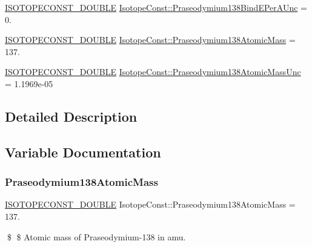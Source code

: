 \begin{DoxyCompactItemize}
\item 
\mbox{\hyperlink{group___isotope_const-_macros_ga8f45a7272ce02c0b4c65c44636ed719a}{I\+S\+O\+T\+O\+P\+E\+C\+O\+N\+S\+T\+\_\+\+D\+O\+U\+B\+LE}} \mbox{\hyperlink{group___isotope_const-_praseodymium-_pr138_gaea243280a0e30badcb25a6fd603f9291}{Isotope\+Const\+::\+Praseodymium138\+Bind\+E\+Per\+A\+Unc}} = 0.
\item 
\mbox{\hyperlink{group___isotope_const-_macros_ga8f45a7272ce02c0b4c65c44636ed719a}{I\+S\+O\+T\+O\+P\+E\+C\+O\+N\+S\+T\+\_\+\+D\+O\+U\+B\+LE}} \mbox{\hyperlink{group___isotope_const-_praseodymium-_pr138_gac33d5ded9b2d19757d1bdcb164920467}{Isotope\+Const\+::\+Praseodymium138\+Atomic\+Mass}} = 137.
\item 
\mbox{\hyperlink{group___isotope_const-_macros_ga8f45a7272ce02c0b4c65c44636ed719a}{I\+S\+O\+T\+O\+P\+E\+C\+O\+N\+S\+T\+\_\+\+D\+O\+U\+B\+LE}} \mbox{\hyperlink{group___isotope_const-_praseodymium-_pr138_ga272861c7648e2ab0210a8c75df8c022f}{Isotope\+Const\+::\+Praseodymium138\+Atomic\+Mass\+Unc}} = 1.\+1969e-\/05
\end{DoxyCompactItemize}


\subsection{Detailed Description}


\subsection{Variable Documentation}
\mbox{\label{group___isotope_const-_praseodymium-_pr138_gac33d5ded9b2d19757d1bdcb164920467}} 
\subsubsection{\texorpdfstring{Praseodymium138\+Atomic\+Mass}{Praseodymium138AtomicMass}}
{\footnotesize\ttfamily \mbox{\hyperlink{group___isotope_const-_macros_ga8f45a7272ce02c0b4c65c44636ed719a}{I\+S\+O\+T\+O\+P\+E\+C\+O\+N\+S\+T\+\_\+\+D\+O\+U\+B\+LE}} Isotope\+Const\+::\+Praseodymium138\+Atomic\+Mass = 137.}

\$ \$ Atomic mass of Praseodymium-\/138 in amu. \mbox{\label{group___isotope_const-_praseodymium-_pr138_ga272861c7648e2ab0210a8c75df8c022f}} 
